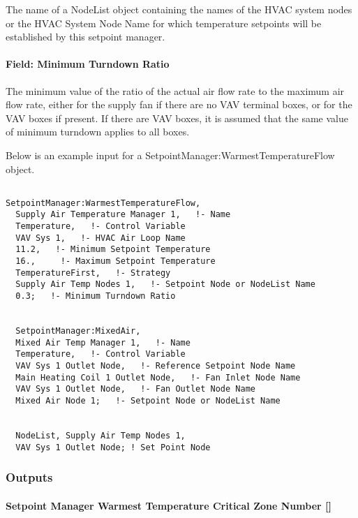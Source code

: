 The name of a NodeList object containing the names of the HVAC system nodes or the HVAC System Node Name for which temperature setpoints will be established by this setpoint manager.

\paragraph{Field: Minimum Turndown Ratio}\label{field-minimum-turndown-ratio}

The minimum value of the ratio of the actual air flow rate to the maximum air flow rate, either for the supply fan if there are no VAV terminal boxes, or for the VAV boxes if present. If there are VAV boxes, it is assumed that the same value of minimum turndown applies to all boxes.

Below is an example input for a SetpointManager:WarmestTemperatureFlow object.

\begin{lstlisting}

SetpointManager:WarmestTemperatureFlow,
  Supply Air Temperature Manager 1,   !- Name
  Temperature,   !- Control Variable
  VAV Sys 1,   !- HVAC Air Loop Name
  11.2,   !- Minimum Setpoint Temperature
  16.,     !- Maximum Setpoint Temperature
  TemperatureFirst,   !- Strategy
  Supply Air Temp Nodes 1,   !- Setpoint Node or NodeList Name
  0.3;   !- Minimum Turndown Ratio


  SetpointManager:MixedAir,
  Mixed Air Temp Manager 1,   !- Name
  Temperature,   !- Control Variable
  VAV Sys 1 Outlet Node,   !- Reference Setpoint Node Name
  Main Heating Coil 1 Outlet Node,   !- Fan Inlet Node Name
  VAV Sys 1 Outlet Node,   !- Fan Outlet Node Name
  Mixed Air Node 1;   !- Setpoint Node or NodeList Name


  NodeList, Supply Air Temp Nodes 1,
  VAV Sys 1 Outlet Node; ! Set Point Node
\end{lstlisting}

\subsubsection{Outputs}\label{outputs-032}

\paragraph{\texorpdfstring{Setpoint Manager Warmest Temperature Critical Zone Number {[]}}{Setpoint Manager Warmest Temperature Critical Zone Number }}\label{setpoint-manager-warmest-temperature-critical-zone-number}

